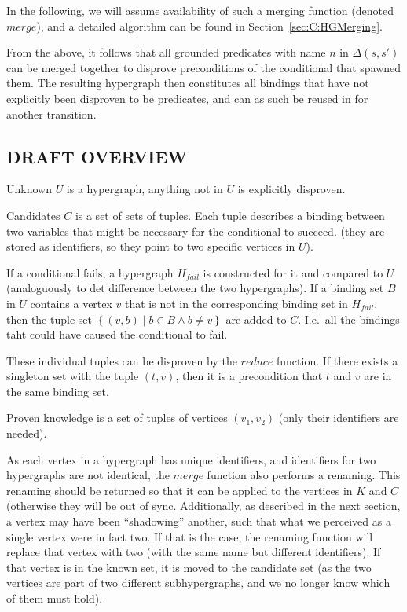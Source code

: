 \documentclass[../Master.tex]{subfiles}
\begin{document}
In the following, we will assume availability of such a merging function (denoted $merge$), and a detailed algorithm can be found in Section~\ref{sec:C:HGMerging}.

From the above, it follows that all grounded predicates with name $n$ in $\Delta\left(s, s'\right)$ can be merged together to disprove preconditions of the conditional that spawned them. The resulting hypergraph then constitutes all bindings that have not explicitly been disproven to be predicates, and can as such be reused in for another transition.

\subsection{DRAFT OVERVIEW}

Unknown $U$ is a hypergraph, anything not in $U$ is explicitly disproven.

Candidates $C$ is a set of sets of tuples. Each tuple describes a binding between two variables that might be necessary for the conditional to succeed. (they are stored as identifiers, so they point to two specific vertices in $U$). 

If a conditional fails, a hypergraph $H_{fail}$ is constructed for it and compared to $U$ (analoguously to det difference between the two hypergraphs). If a binding set $B$ in $U$ contains a vertex $v$ that is not in the corresponding binding set in $H_{fail}$, then the tuple set $\left\{ (v, b) \mid b \in B \land b \neq v \right\}$ are added to $C$. I.e.\ all the bindings taht could have caused the conditional to fail.

These individual tuples can be disproven by the $reduce$ function. If there exists a singleton set with the tuple $(t, v)$, then it is a precondition that $t$ and $v$ are in the same binding set.

Proven knowledge is a set of tuples of vertices $(v_1, v_2)$ (only their identifiers are needed).

As each vertex in a hypergraph has unique identifiers, and identifiers for two hypergraphs are not identical, the $merge$ function also performs a renaming. This renaming should be returned so that it can be applied to the vertices in $K$ and $C$ (otherwise they will be out of sync. Additionally, as described in the next section, a vertex may have been ``shadowing'' another, such that what we perceived as a single vertex were in fact two. If that is the case, the renaming function will replace that vertex with two (with the same name but different identifiers). If that vertex is in the known set, it is moved to the candidate set (as the two vertices are part of two different subhypergraphs, and we no longer know which of them must hold).
\end{document}
